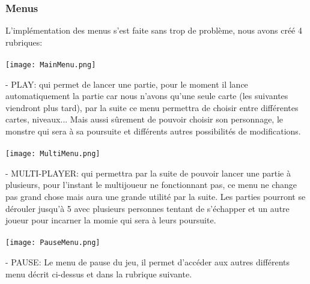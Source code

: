 \documentclass[12pt,a4paper]{article}
\begin{document}
\newpage
\subsubsection{Menus}
L'implémentation des menus s'est faite sans trop de problème, nous avons créé 4 rubriques:


\paragraph{}
\begin{center}
\texttt{[image: MainMenu.png]}
\end{center}

\item[-] PLAY: qui permet de lancer une partie, pour le moment il lance automatiquement la partie car nous n'avons qu'une seule carte (les suivantes viendront plus tard), par la suite ce menu permettra de choisir entre différentes cartes, niveaux...
Mais aussi sûrement de pouvoir choisir son personnage, le monstre qui sera à sa poursuite et différents autres possibilités de modifications.

\newpage

\paragraph{}
\begin{center}
\texttt{[image: MultiMenu.png]}
\end{center}

\item[-] MULTI-PLAYER: qui permettra par la suite de pouvoir lancer une partie à plusieurs, pour l'instant le multijoueur ne fonctionnant pas, ce menu ne change pas grand chose mais aura une grande utilité par la suite. Les parties pourront se dérouler jusqu'à 5 avec plusieurs personnes tentant de s'échapper et un autre joueur pour incarner la momie qui sera à leurs poursuite.

\paragraph{}
\begin{center}
\texttt{[image: PauseMenu.png]}
\end{center}

\item[-] PAUSE: Le menu de pause du jeu, il permet d'accéder aux autres différents menu décrit ci-dessus et dans la rubrique suivante.
\end{document}
